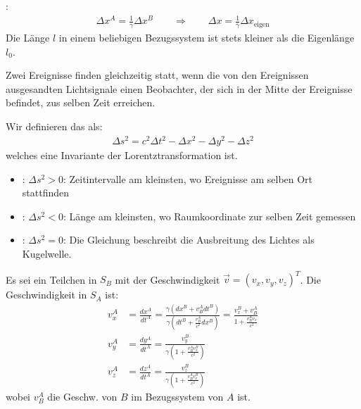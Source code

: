 \vspace{1\baselineskip}

:
\begin{align*}
    \Delta x^A = \frac{1}{\gamma} \Delta x^B
    \quad \quad \Longrightarrow \quad \quad
    \Delta x = \frac{1}{\gamma} \Delta x_{\text{eigen}}
\end{align*}
Die Länge $l$ in einem beliebigen Bezugssystem ist stets kleiner als die Eigenlänge $l_0$.

\vspace{1\baselineskip}


Zwei Ereignisse finden gleichzeitig statt, wenn die von den Ereignissen ausgesandten
Lichtsignale einen Beobachter, der sich in der Mitte der Ereignisse befindet, zus selben
Zeit erreichen.

\vspace{1\baselineskip}


Wir definieren das  als:
\begin{align*}
    \Delta s^2 = c^2 \Delta t^2 - \Delta x^2 - \Delta y^2 - \Delta z^2
\end{align*}
welches eine Invariante der Lorentztransformation ist.
\begin{itemize}
    \item {}: $\Delta s^2 > 0$: Zeitintervalle am kleinsten, wo Ereignisse
            am selben Ort stattfinden
    \item {}: $\Delta s^2 < 0$: Länge am kleinsten, wo Raumkoordinate zur
            selben Zeit gemessen
    \item {}: $\Delta s^2 = 0$: Die Gleichung beschreibt die Ausbreitung
            des Lichtes als Kugelwelle.
\end{itemize}

\vspace{1\baselineskip}


Es sei ein Teilchen in $S_B$ mit der Geschwindigkeit $\vec{v} = (v_x , v_y , v_z)^T$.
Die Geschwindigkeit in $S_A$ ist:
\begin{align*}
    v_x^{A} &= \frac{dx^{A}}{dt^{A}} = \frac{\gamma (dx^B + v_B^{A} dt^B)}{\gamma (dt^B + \frac{v_B^{A}}{c^2} dx^B)}
        = \frac{v_x^B + v_B^{A}}{1+\frac{v_B^{A} v_x}{c^2}}
    \\
    v_y^{A} &= \frac{dy^{A}}{dt^{A}} = \frac{v_y^B}{\gamma (1+ \frac{v_B^{A} v_x^B}{c^2})}
    \\
    v_z^{A} &= \frac{dz^{A}}{dt^{A}} = \frac{v_z^B}{\gamma (1+ \frac{v_B^{A} v_x^B}{c^2})}
\end{align*}
wobei $v_B^{A}$ die Geschw. von $B$ im Bezugssystem von $A$ ist.

